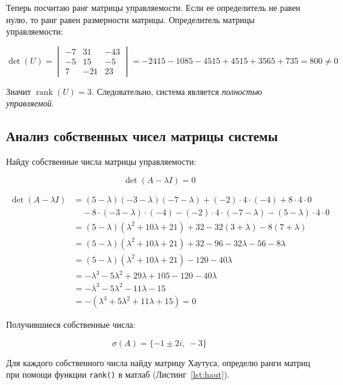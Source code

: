 \documentclass[a4paper,12pt]{article}
\begin{document}
	Теперь посчитаю ранг матрицы управляемости. Если ее определитель не равен нулю, то ранг равен размерности матрицы.
	Определитель матрицы управляемости:
	
	\[
	\det(U) =
	\begin{vmatrix}
		-7 & 31 & -43 \\
		-5 & 15 & -5 \\
		7 & -21 & 23
	\end{vmatrix}
	= -2415 - 1085 - 4515 + 4515 + 3565 + 735 = 800 \neq 0
	\]
	
	Значит $\operatorname{rank}(U) = 3$. Следовательно, система является \textit{полностью управляемой}.
	
	\subsection{Анализ собственных чисел матрицы системы}
	
	Найду собственные числа матрицы управляемости:
	
	\[
	\operatorname{det}(A -\lambda I) = 0
	\]
	
	\begin{align*}
		\det(A - \lambda I) &=
		(5-\lambda)(-3-\lambda)(-7-\lambda)
		+ (-2)\cdot4\cdot(-4)
		+ 8\cdot4\cdot0 \\
		&\quad - 8\cdot(-3-\lambda)\cdot(-4)
		- (-2)\cdot4\cdot(-7-\lambda)
		- (5-\lambda)\cdot4\cdot0 \\[6pt]
		&= (5-\lambda)(\lambda^2+10\lambda+21) + 32 - 32(3+\lambda) - 8(7+\lambda) \\[6pt]
		&= (5-\lambda)(\lambda^2+10\lambda+21) + 32 - 96 - 32\lambda - 56 - 8\lambda \\[6pt]
		&= (5-\lambda)(\lambda^2+10\lambda+21) - 120 - 40\lambda \\[6pt]
		&= -\lambda^3 - 5\lambda^2 + 29\lambda + 105 - 120 - 40\lambda \\[6pt]
		&= -\lambda^3 - 5\lambda^2 - 11\lambda - 15 \\[6pt]
		&= -(\lambda^3 + 5\lambda^2 + 11\lambda + 15) = 0
	\end{align*}
	
	Получившиеся собственные числа:
	
	\[\sigma(A) = \{-1 \pm 2i, \ -3\}\]
	
	Для каждого собственного числа найду матрицу Хаутуса, определю ранги матриц при помощи функции \texttt{rank()} в матлаб (Листинг~\ref{lst:haut}).
	
\end{document}
